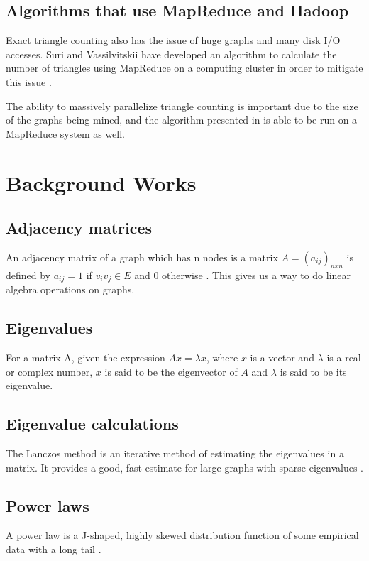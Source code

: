 \documentclass{acm_proc_article-sp}
\begin{document}
\subsection{Algorithms that use MapReduce and Hadoop}
Exact triangle counting also has the issue of huge graphs and many disk I/O
accesses. Suri and Vassilvitskii have developed an algorithm to calculate the
number of triangles using MapReduce on a computing cluster in order to mitigate
this issue \cite{suri}.

The ability to massively parallelize triangle counting is important due to the
size of the graphs being mined, and the algorithm presented in \cite{original} 
is able to be run on a MapReduce system as well.

\section{Background Works}

\subsection{Adjacency matrices}
An adjacency matrix of a graph which has n nodes is a matrix $A = 
(a_{ij})_{nxn}$ is defined by $a_{ij} = 1$ if $v_iv_j \in E$ and $0$ otherwise
\cite{diestel}.  This gives us a way to do linear algebra operations on graphs.

\subsection{Eigenvalues}
For a matrix A, given the expression $Ax = \lambda x$, where $x$ is a vector and
$\lambda$ is a real or complex number, $x$ is said to be the eigenvector of $A$
and $\lambda$ is said to be its eigenvalue. \cite{lovasz}

\subsection{Eigenvalue calculations}
The Lanczos method is an iterative method of estimating the eigenvalues in a
matrix. It provides a good, fast estimate for large graphs with sparse
eigenvalues \cite{golub}.

\subsection{Power laws}
A power law is a J-shaped, highly skewed distribution function of some
empirical data with a long tail \cite{simon}.
\end{document}
